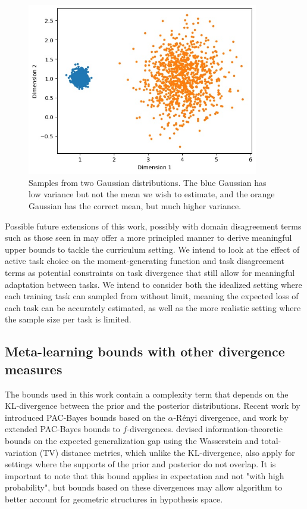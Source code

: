 \documentclass{article}
\theoremstyle{definition}
\begin{document}
\begin{figure}
	\centering
	\includegraphics[width=0.9\textwidth]{cl_example.JPG}
	\caption{Samples from two Gaussian distributions. The blue Gaussian has low variance but not the mean we wish to estimate, and the orange Gaussian has the correct mean, but much higher variance.}
	\label{fig:cl_demo}
\end{figure}

Possible future extensions of this work, possibly with domain disagreement terms such as those seen in \citet{Germain2020} may offer a more principled manner to derive meaningful upper bounds to tackle the curriculum setting. We intend to look at the effect of active task choice on the moment-generating function and task disagreement terms as potential constraints on task divergence that still allow for meaningful adaptation between tasks. We intend to consider both the idealized setting where each training task can sampled from without limit, meaning the expected loss of each task can be accurately estimated, as well as the more realistic setting where the sample size per task is limited.

\subsection{Meta-learning bounds with other divergence measures}

The bounds used in this work contain a complexity term that depends on the KL-divergence between the prior and the posterior distributions. Recent work by \citet{Begin2016} introduced PAC-Bayes bounds based on the $\alpha$-R\'{e}nyi divergence, and work by \citet{Ohnishi2020} extended PAC-Bayes bounds to $f$-divergences. \citet{Lugosi2022} devised information-theoretic bounds on the expected generalization gap using the Wasserstein and total-variation (TV) distance metrics, which unlike the KL-divergence, also apply for settings where the supports of the prior and posterior do not overlap. It is important to note that this bound applies in expectation and not "with high probability", but bounds based on these divergences may allow algorithm to better account for geometric structures in hypothesis space.
\end{document}
